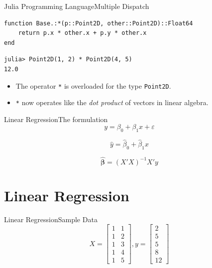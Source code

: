 \documentclass[11pt]{beamer}
\begin{document}
\begin{frame}[fragile]{Julia Programming Language}{Multiple Dispatch}
\begin{lstlisting}[basicstyle=\small]
function Base.:*(p::Point2D, other::Point2D)::Float64
	return p.x * other.x + p.y * other.x
end 
\end{lstlisting}
\begin{lstlisting}
julia> Point2D(1, 2) * Point2D(4, 5)
12.0
\end{lstlisting}
\begin{itemize}
\item The operator \texttt{*} is overloaded for the type \texttt{Point2D}.
\item \texttt{*} now operates like the \emph{dot product} of vectors in linear algebra.
\end{itemize}
\end{frame}

\begin{frame}[fragile]{Linear Regression}{The formulation}
\begin{equation}
y = \beta_0 + \beta_1 x + \varepsilon
\end{equation}

\begin{equation}
	\hat{y} = \hat{\beta}_0 + \hat{\beta}_1 x 
\end{equation}

\begin{equation}
	\hat{\boldsymbol{\beta}} = (X'X)^{-1}X'y
\end{equation}
\end{frame}


\section{Linear Regression}
\begin{frame}[fragile]{Linear Regression}{Sample Data}
\begin{equation}
X = \begin{bmatrix}
	1 & 1 \\
	1 & 2 \\
	1 & 3 \\
	1 & 4 \\
	1 & 5 
\end{bmatrix}, y = \begin{bmatrix}
2 \\
5 \\ 
5 \\ 
8 \\ 
12
\end{bmatrix}
\end{equation}
\end{frame}
\end{document}
